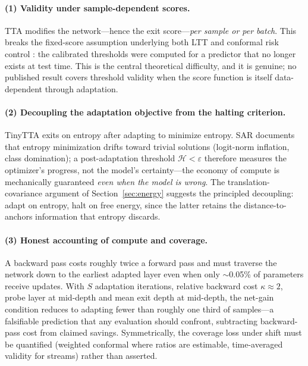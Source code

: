 \documentclass[preprint,12pt]{elsarticle}
\begin{document}
\paragraph{(1) Validity under sample-dependent scores.}
TTA modifies the network---hence the exit score---\emph{per sample or per batch}. This breaks the fixed-score assumption underlying both LTT \citep{angelopoulos2025ltt} and conformal risk control \citep{angelopoulos2024crc}: the calibrated thresholds were computed for a predictor that no longer exists at test time. This is the central theoretical difficulty, and it is genuine; no published result covers threshold validity when the score function is itself data-dependent through adaptation.

\paragraph{(2) Decoupling the adaptation objective from the halting criterion.}
TinyTTA exits on entropy after adapting to minimize entropy. SAR \citep{niu2023sar} documents that entropy minimization drifts toward trivial solutions (logit-norm inflation, class domination); a post-adaptation threshold $\mathcal{H} < \varepsilon$ therefore measures the optimizer's progress, not the model's certainty---the economy of compute is mechanically guaranteed \emph{even when the model is wrong}. The translation-covariance argument of Section~\ref{sec:energy} suggests the principled decoupling: adapt on entropy, halt on free energy, since the latter retains the distance-to-anchors information that entropy discards.

\paragraph{(3) Honest accounting of compute and coverage.}
A backward pass costs roughly twice a forward pass and must traverse the network down to the earliest adapted layer even when only $\sim$0.05\% of parameters receive updates. With $S$ adaptation iterations, relative backward cost $\kappa \approx 2$, probe layer at mid-depth and mean exit depth at mid-depth, the net-gain condition reduces to adapting fewer than roughly one third of samples---a falsifiable prediction that any evaluation should confront, subtracting backward-pass cost from claimed savings. Symmetrically, the coverage loss under shift must be quantified (weighted conformal where ratios are estimable, time-averaged validity for streams) rather than asserted.
\end{document}
